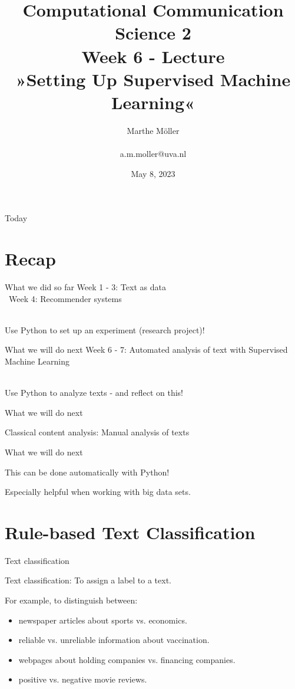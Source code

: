 \documentclass[compress]{beamer}
\title[Computational Communication Science 2]{\textbf{Computational Communication Science 2} \\Week 6 - Lecture\\ »Setting Up Supervised Machine Learning«}
\author[A. Marthe Möller]{Marthe Möller \\ ~ \\ \footnotesize{a.m.moller@uva.nl} \\}
\date{May 8, 2023}
\institute[Digital Society Minor, University of Amsterdam]{Digital Society Minor, University of Amsterdam}
\begin{document}
	
\begin{frame}{}
	\titlepage
\end{frame}
	
\begin{frame}{Today}
	\begin{tiny}
	\tableofcontents
	\end{tiny}
\end{frame}


\section{Recap}

\begin{frame}[fragile]{What we did so far}
Week 1 - 3: Text as data \\\
Week 4: Recommender systems \\\

Use Python to set up an experiment (research project)!
\end{frame}

\begin{frame}[fragile]{What we will do next}
Week 6 - 7: Automated analysis of text with Supervised Machine Learning \\\

Use Python to analyze texts - and reflect on this!
\end{frame}


\begin{frame}[fragile]{What we will do next} 
	
Classical content analysis:	
Manual analysis of texts
\end{frame}

\begin{frame}[fragile]{What we will do next} 
	
This can be done automatically with Python!
	
Especially helpful when working with big data sets.
\end{frame}


\section{Rule-based Text Classification}

\begin{frame}[fragile]{Text classification}

Text classification: To assign a label to a text.

\pause
\normalsize

\begin{alertblock}{For example, to distinguish between:}
	\begin{itemize}
	\item newspaper articles about sports vs. economics.
	\item reliable vs. unreliable information about vaccination.
	\item webpages about holding companies vs. financing companies.
	\item positive vs. negative movie reviews.
\end{itemize}
\end{alertblock}
\end{frame}
\end{document}
